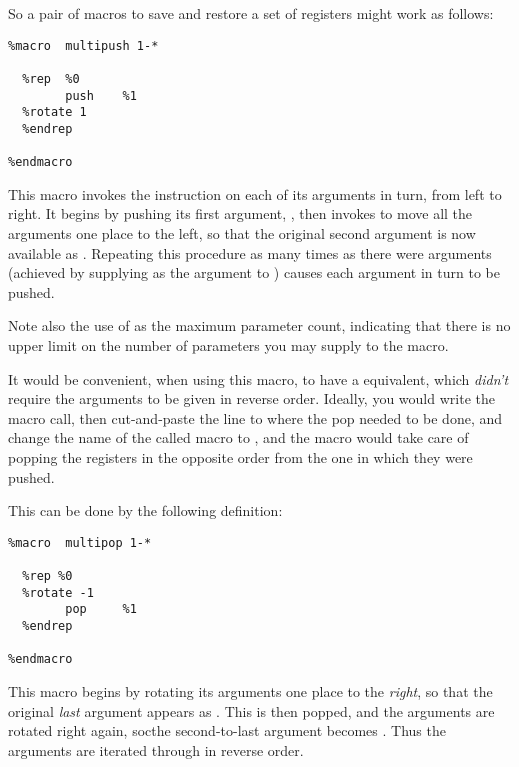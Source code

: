 So a pair of macros to save and
restore a set of registers might work as follows:

\begin{lstlisting}
%macro  multipush 1-*

  %rep  %0
        push    %1
  %rotate 1
  %endrep

%endmacro
\end{lstlisting}

This macro invokes the  instruction on each of its arguments
in turn, from left to right. It begins by pushing its first
argument, , then invokes  to move all the arguments
one place to the left, so that the original second argument is now
available as . Repeating this procedure as many times as there
were arguments (achieved by supplying  as the argument to
) causes each argument in turn to be pushed.

Note also the use of \code{*} as the maximum parameter count,
indicating that there is no upper limit on the number of parameters
you may supply to the  macro.

It would be convenient, when using this macro, to have a 
equivalent, which \emph{didn't} require the arguments to be given in
reverse order. Ideally, you would write the  macro
call, then cut-and-paste the line to where the pop needed to be
done, and change the name of the called macro to , and
the macro would take care of popping the registers in the opposite
order from the one in which they were pushed.

This can be done by the following definition:

\begin{lstlisting}
%macro  multipop 1-*

  %rep %0
  %rotate -1
        pop     %1
  %endrep

%endmacro
\end{lstlisting}

This macro begins by rotating its arguments one place to the
\emph{right}, so that the original \emph{last} argument appears
as . This is then popped, and the arguments are rotated
right again, socthe second-to-last argument becomes .
Thus the arguments are iterated through in reverse order.

\subsection{}
\label{subsec:concat}

